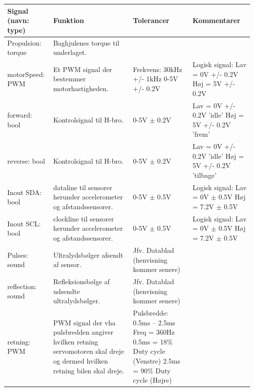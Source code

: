 \begin{table}[h]
	\centering
	\begin{tabularx}{\textwidth}{|l|Z|Z|Z|} \hline
	\textbf{Signal (navn: type)} & \textbf{Funktion} & \textbf{Tolerancer} & \textbf{Kommentarer} \\ \hline

Propulsion: torque
	& Baghjulenes torque til underlaget.
	& ~
	& ~
	\\ \hline

motorSpeed: PWM
	& Et PWM signal der bestemmer motorhastigheden. 
	& Frekvens: 30kHz +/- 1kHz 0-5V +/- 0.2V
 	& Logisk signal: \newline
		Lav = 0V +/- 0.2V \newline
		Høj = 5V +/- 0.2V
	\\ \hline

forward: bool
	& Kontrolsignal til H-bro.
	& 0-5V $\pm$ 0.2V
	& Lav = 0V +/- 0.2V  ’idle’ \newline
		Høj =  5V +/- 0.2V  ’frem’
	\\ \hline
	
reverse: bool
	& Kontrolsignal til H-bro.
	& 0-5V $\pm$ 0.2V
	& Lav = 0V +/- 0.2V ’idle’ \newline
		Høj =  5V +/- 0.2V  ’tilbage’
	\\ \hline
	
Inout SDA: bool
	& \IIC dataline til sensorer herunder accelerometer og afstandssensorer. 
	& 0-5V $\pm$ 0.5V
 	& Logisk signal: \newline
		Lav = 0V $\pm$ 0.5V \newline
		Høj = 7.2V $\pm$ 0.5V
	\\ \hline

Inout SCL: bool
	& \IIC clockline  til sensorer herunder accelerometer og afstandssensorer. 
	& 0-5V $\pm$ 0.5V
 	& Logisk signal: \newline
		Lav = 0V $\pm$ 0.5V \newline
		Høj = 7.2V $\pm$ 0.5V
	\\ \hline

Pulses: sound
	& Ultralydsbølger afsendt af sensor. 
	& Jfv. Datablad (henvisning kommer senere) %
 	& ~
	\\ \hline
	
reflection: sound
	& Refleksionsbølge af udsendte ultralydsbølger. 
	& Jfv. Datablad (henvisning kommer senere) %
 	& ~
	\\ \hline
	
retning: PWM 
	& PWM signal der vha pulsbredden angiver hvilken retning servomotoren skal 				dreje og dermed hvilken retning bilen skal dreje. 
	& Pulsbredde: 0.5ms – 2.5ms \newline
		Freq = 360Hz \newline
		0.5ms = 18\% Duty cycle (Venstre)\newline
		2.5ms = 90\% Duty cycle (Højre)
	& ~
	\\ \hline


\end{tabularx}
\end{table}
